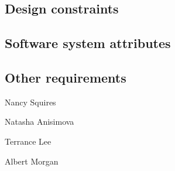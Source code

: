 \documentclass[10pt,journal,draftclsnofoot,onecolumn]{IEEEtran}
\begin{document}
	\subsection{Design constraints}
	\subsection{Software system attributes}
	\subsection{Other requirements}




	\vspace{1in}
	\noindent Nancy Squires

	\vspace{1in}
	\noindent Natasha Anisimova

	\vspace{1in}
	\noindent Terrance Lee

	\vspace{1in}
	\noindent Albert Morgan\\
	
\end{document}
